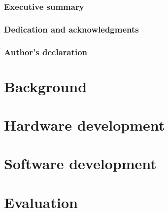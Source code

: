 \documentclass[12pt]{article}
\begin{document}





\section*{Executive summary}


\section*{Dedication and acknowledgments}


\section*{Author's declaration}


\clearpage
\begingroup
\pagestyle{plain}
\vspace*{3cm}
\tableofcontents
\clearpage
\endgroup





\newpage

\part{Background}





\newpage
\part{Hardware development}









\newpage
\part{Software development}



\newpage
\part{Evaluation}



\printbibliography


\end{document}
